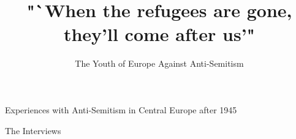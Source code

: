 \documentclass{book}
\begin{document}
\begin{titlepage}
\title{"`When the refugees are gone, they'll come after us'"}
\Large{Experiences with Anti-Semitism in Central Europe after 1945}
\author{The Youth of Europe Against Anti-Semitism}
\end{titlepage}
\tableofcontents


\newpage
\begin{center}
  \Large{The Interviews}  
\end{center}























\nocite{*}
\printbibliography
\end{document}
